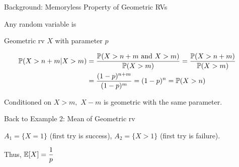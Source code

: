 
\begin{frame}{Background: Memoryless Property of Geometric RVs}

\plitemsep 0.07in
\bci 

\item {} Any  random variable is 

\item<2->  Geometric rv $X$ with parameter $p$


\item<3-> \proff 
\begin{align*}
\mathbb{P}( X > n+m | X > m ) &= \frac{\mathbb{P}( X > n+m \text{ and } X > m )}{\mathbb{P}( X > m )} 
 = \frac{\mathbb{P}( X > n+m )}{\mathbb{P}( X > m )}\cr
& = \frac{(1-p)^{n+m}}{(1-p)^m} = (1-p)^n = \mathbb{P}( X >n )
\end{align*}

\item<4->  Conditioned on $X > m,$ $X-m$ is geometric with the same parameter. 

\eci

\end{frame}


\begin{frame}{Back to Example 2: Mean of Geometric rv}


\plitemsep 0.2in

\bci 

\item<1-> $A_1 = \{X=1 \}$ (first try is success), $A_2 = \{X >1 \}$ (first try is failure).  


\item<4-> Thus, $\mathbb{E}[ X ] = \dfrac{1}{p}$
\eci


\end{frame}

